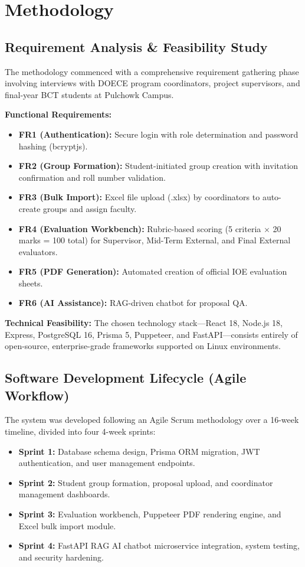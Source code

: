 \documentclass[12pt]{report}
\begin{document}
\chapter{Methodology}

\section{Requirement Analysis & Feasibility Study}
The methodology commenced with a comprehensive requirement gathering phase involving interviews with DOECE program coordinators, project supervisors, and final-year BCT students at Pulchowk Campus.

\textbf{Functional Requirements:}
\begin{itemize}
    \item \textbf{FR1 (Authentication):} Secure login with role determination and password hashing (bcryptjs).
    \item \textbf{FR2 (Group Formation):} Student-initiated group creation with invitation confirmation and roll number validation.
    \item \textbf{FR3 (Bulk Import):} Excel file upload (.xlsx) by coordinators to auto-create groups and assign faculty.
    \item \textbf{FR4 (Evaluation Workbench):} Rubric-based scoring (5 criteria $\times$ 20 marks = 100 total) for Supervisor, Mid-Term External, and Final External evaluators.
    \item \textbf{FR5 (PDF Generation):} Automated creation of official IOE evaluation sheets.
    \item \textbf{FR6 (AI Assistance):} RAG-driven chatbot for proposal QA.
\end{itemize}

\textbf{Technical Feasibility:} The chosen technology stack—React 18, Node.js 18, Express, PostgreSQL 16, Prisma 5, Puppeteer, and FastAPI—consists entirely of open-source, enterprise-grade frameworks supported on Linux environments.

\section{Software Development Lifecycle (Agile Workflow)}
The system was developed following an Agile Scrum methodology over a 16-week timeline, divided into four 4-week sprints:
\begin{itemize}
    \item \textbf{Sprint 1:} Database schema design, Prisma ORM migration, JWT authentication, and user management endpoints.
    \item \textbf{Sprint 2:} Student group formation, proposal upload, and coordinator management dashboards.
    \item \textbf{Sprint 3:} Evaluation workbench, Puppeteer PDF rendering engine, and Excel bulk import module.
    \item \textbf{Sprint 4:} FastAPI RAG AI chatbot microservice integration, system testing, and security hardening.
\end{itemize}
\end{document}
